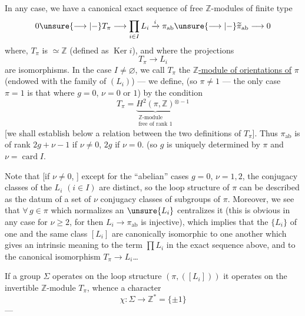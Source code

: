 In any case, we have a canonical exact sequence
of free $\mathbb Z$-modules of finite type
\[
0\unsure{\longrightarrow|-}T_\pi\longrightarrow\prod_{i\in I}L_i
\xrightarrow{i}\pi_{\mathrm{ab}}\unsure{\longrightarrow|-}\widetilde\pi_{\mathrm{ab}}\longrightarrow0
\]
where,  $T_\pi$ is $\simeq\mathbb Z$ (defined as $\operatorname{Ker}i$), and where
the projections
\[
T_\pi\longrightarrow L_i
\]
are isomorphisms. In the case $I\ne\varnothing$, we
call $T_\pi$ the \uline{$\mathbb Z$-module of orientations of}
$\pi$ (endowed with the family of $(L_i)$) ---
we define,  
(so $\pi\ne1$ --- the only case $\pi=1$ is that where
$g=0$, $\nu=0$ or $1$) by the condition
\[
T_\pi=\underbrace{H^2(\pi,\mathbb Z)}_{\substack{\mathbb Z\text{-module}\\\text{free of rank }1}}{}^{\otimes-1}
\]
[we shall establish below a relation between the
two definitions of $T_\pi$]. Thus $\pi_{\mathrm{ab}}$
is  of rank $2g+\nu-1$ if $\nu\ne0$, $2g$ if $\nu=0$.
(so $g$ is uniquely determined by $\pi$ and $\nu=\operatorname{card}I$.



Note that [if $\nu\ne0$, ] except for the ``abelian''
cases $g=0$, $\nu=1,2$, the conjugacy classes
of the $L_i$ $(i\in I)$ are distinct, so the
loop structure of $\pi$ can be described
as the datum of a set of $\nu$ conjugacy
classes of subgroups of $\pi$. Moreover,
we see that $\forall\,g\in\pi$ which normalizes
an $\unsure{L_i}$ centralizes it (this is obvious
in any case for $\nu\ge2$, for then
$L_i\to\pi_{\mathrm{ab}}$ is injective), which implies
that the $\{L_i\}$ of one and the same class $[L_i]$
are canonically isomorphic to one another
which gives an intrinsic meaning to the
term $\prod L_i$ in the exact sequence
above, and to the canonical isomorphism $T_\pi\to L_i$\dots
{}

If a group $\Sigma$ operates on the loop
structure $(\pi,([L_i]))$ it operates on the
invertible $\mathbb Z$-module $T_\pi$, whence a
character
\[
\chi:\Sigma\longrightarrow\mathbb Z^{*}=\{\pm1\}
\]
---

